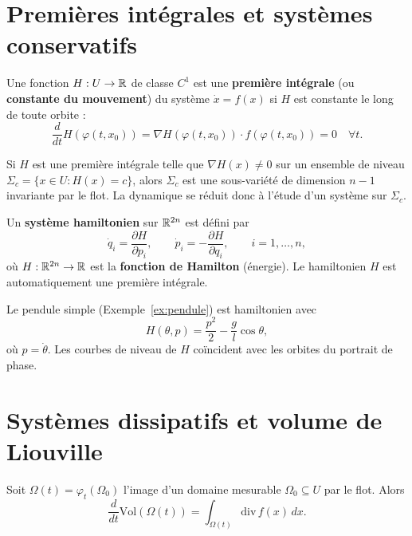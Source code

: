 \section{Premi\`eres int\'egrales et syst\`emes conservatifs}

\begin{definition}
Une fonction $H : U \to \mathbb{R}$ de classe $C^1$ est une \textbf{premi\`ere
int\'egrale} (ou \textbf{constante du mouvement}) du syst\`eme $\dot{x} = f(x)$
si $H$ est constante le long de toute orbite :
\[
    \frac{d}{dt} H(\varphi(t, x_0)) = \nabla H(\varphi(t, x_0)) \cdot
    f(\varphi(t, x_0)) = 0 \quad \forall t.
\]
\end{definition}

\begin{theoreme}
Si $H$ est une premi\`ere int\'egrale telle que $\nabla H(x) \neq 0$ sur un
ensemble de niveau $\Sigma_c = \{x \in U : H(x) = c\}$, alors $\Sigma_c$
est une sous-vari\'et\'e de dimension $n-1$ invariante par le flot.
La dynamique se r\'eduit donc \`a l'\'etude d'un syst\`eme sur $\Sigma_c$.
\end{theoreme}

\begin{definition}
Un \textbf{syst\`eme hamiltonien} sur $\mathbb{R}^{2n}$ est d\'efini par
\[
    \dot{q}_i = \frac{\partial H}{\partial p_i}, \qquad
    \dot{p}_i = -\frac{\partial H}{\partial q_i}, \qquad i = 1, \ldots, n,
\]
o\`u $H : \mathbb{R}^{2n} \to \mathbb{R}$ est la \textbf{fonction de Hamilton} (\'energie).
Le hamiltonien $H$ est automatiquement une premi\`ere int\'egrale.
\end{definition}

\begin{exemple}
Le pendule simple (Exemple~\ref{ex:pendule}) est hamiltonien avec
\[
    H(\theta, p) = \frac{p^2}{2} - \frac{g}{l}\cos\theta,
\]
o\`u $p = \dot{\theta}$. Les courbes de niveau de $H$ co\"incident avec
les orbites du portrait de phase.
\end{exemple}

\section{Syst\`emes dissipatifs et volume de Liouville}

\begin{theoreme}
\label{thm:liouville}
Soit $\Omega(t) = \varphi_t(\Omega_0)$ l'image d'un domaine mesurable
$\Omega_0 \subseteq U$ par le flot. Alors
\[
    \frac{d}{dt}\mathrm{Vol}(\Omega(t)) = \int_{\Omega(t)} \mathrm{div}\, f(x)\, dx.
\]
\end{theoreme}

